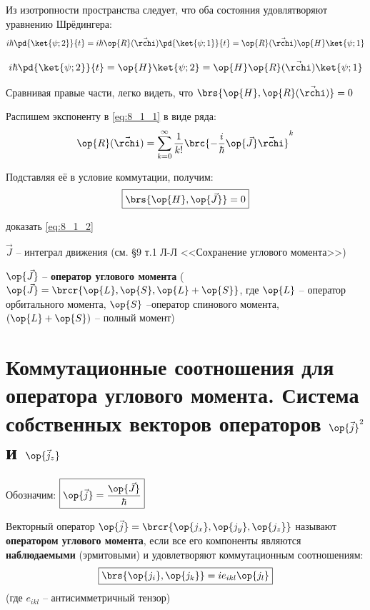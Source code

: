 Из изотропности пространства следует, что оба состояния удовлятворяют уравнению Шрёдингера:
$$
i\hbar \pd{\ket{\psi;2}}{t} = i\hbar \op{R}(\vec{\rchi}) \pd{\ket{\psi;1}}{t} = \op{R}(\vec{\rchi}) \op{H}\ket{\psi;1}
$$

$$
i\hbar \pd{\ket{\psi;2}}{t} = \op{H}\ket{\psi;2} = \op{H} \op{R}(\vec{\rchi}) \ket{\psi;1}
$$

Сравнивая правые части, легко видеть, что $\brs{\op{H}, \op{R}(\vec{\rchi})} = 0$

Распишем экспоненту в \eqref{eq:8_1_1} в виде ряда:
$$
\op{R}(\vec{\rchi}) = \sum_{k=0}^{\infty} \frac{1}{k!} \brc{- \frac{i}{\hbar} \op{\vec{J}} \vec{\rchi}}^k
$$

Подставляя её в условие коммутации, получим:
\begin{equation}
\label{eq:8_1_2}
\boxed {
	\brs{\op{H}, \op{\vec{J}}} = 0
}
\end{equation}

\begin{excr}
доказать \eqref{eq:8_1_2}
\end{excr}

$\vec{J}$ -- интеграл движения (см. \S 9 т.1 Л-Л <<Сохранение углового момента>>)

$\op{\vec{J}}$ -- \textbf{оператор углового момента} ($\op{\vec{J}} = \brcr{\op{L}, \op{S}, \op{L}+\op{S}}$, где $\op{L}$ -- оператор орбитального момента, $\op{S}$ --оператор спинового момента, $(\op{L} + \op{S})$ -- полный момент)

\begin{sloppypar}
  \section{Коммутационные соотношения для оператора углового момента. Система собственных векторов операторов \texorpdfstring{$\op{\vec{j}}^2$ и $\op{\vec{j}_z}$}{углового момента}}
\end{sloppypar}

Обозначим: $\boxed{\op{\vec{j}} = \frac{\op{\vec{J}}}{\hbar}}$

\begin{defn}
Векторный оператор $\op{\vec{j}} = \brcr{\op{j_x}, \op{j_y}, \op{j_z}}$ называют \textbf{оператором углового момента}, если все его компоненты являются \textbf{наблюдаемыми} (эрмитовыми) и удовлетворяют коммутационным соотношениям:
\begin{equation}
\label{eq:8_2_1}
\boxed {
	\brs{\op{j_i}, \op{j_k}} = i e_{ikl} \op{j_l}
}
\end{equation}
(где $e_{ikl}$ -- антисимметричный тензор)
\end{defn}

